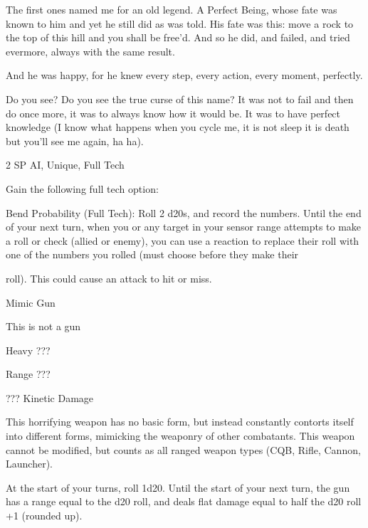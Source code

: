 The first ones named me for an old legend. A Perfect Being, whose fate was known to him and yet he still  
did as was told. His fate was this: move a rock to the top of this hill and you shall be free’d. And so he did,  
and failed, and tried evermore, always with the same result.   

And he was happy, for he knew every step, every action, every moment, perfectly.   

Do you see? Do you see the true curse of this name? It was not to fail and then do once more, it was to  
always know how it would be. It was to have perfect knowledge (I know what happens when you cycle me,  
it is not sleep it is death but you’ll see me again, ha ha).  

2 SP  
AI, Unique, Full Tech  

Gain the following full tech option:
 

	        Bend Probability (Full Tech): Roll 2 d20s, and record the numbers. Until the end of your next turn,  
when you or any target in your sensor range attempts to make a roll or check (allied or enemy), you can  
use a reaction to replace their roll with one of the numbers you rolled (must choose before they make their  

roll). This could cause an attack to hit or miss.
 

Mimic Gun  

This is not a gun  

Heavy ???
 
Range ???
 
??? Kinetic Damage
 

This horrifying weapon has no basic form, but instead constantly contorts itself into different  
forms, mimicking the weaponry of other combatants. This weapon cannot be modified, but  
counts as all ranged weapon types (CQB, Rifle, Cannon, Launcher). 
 

At the start of your turns, roll 1d20. Until the start of your next turn, the gun has a range equal to  
the d20 roll, and deals flat damage equal to half the d20 roll +1 (rounded up).
 